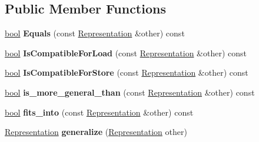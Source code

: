 \subsection*{Public Member Functions}
\begin{DoxyCompactItemize}
\item 
\mbox{\label{classv8_1_1internal_1_1Representation_aa84e9e08d7aa134ade62588b6353aaeb}} 
\mbox{\hyperlink{classbool}{bool}} {\bfseries Equals} (const \mbox{\hyperlink{classv8_1_1internal_1_1Representation}{Representation}} \&other) const
\item 
\mbox{\label{classv8_1_1internal_1_1Representation_a8127928bb5b6b4ab191cf394c6650260}} 
\mbox{\hyperlink{classbool}{bool}} {\bfseries Is\+Compatible\+For\+Load} (const \mbox{\hyperlink{classv8_1_1internal_1_1Representation}{Representation}} \&other) const
\item 
\mbox{\label{classv8_1_1internal_1_1Representation_a5763bb09b83c85d7a1c31c5dc65b25f6}} 
\mbox{\hyperlink{classbool}{bool}} {\bfseries Is\+Compatible\+For\+Store} (const \mbox{\hyperlink{classv8_1_1internal_1_1Representation}{Representation}} \&other) const
\item 
\mbox{\label{classv8_1_1internal_1_1Representation_a204311b6c7ea002cd2a78909b16f4db4}} 
\mbox{\hyperlink{classbool}{bool}} {\bfseries is\+\_\+more\+\_\+general\+\_\+than} (const \mbox{\hyperlink{classv8_1_1internal_1_1Representation}{Representation}} \&other) const
\item 
\mbox{\label{classv8_1_1internal_1_1Representation_a358b22922554e7c1c08eb68e74c8d904}} 
\mbox{\hyperlink{classbool}{bool}} {\bfseries fits\+\_\+into} (const \mbox{\hyperlink{classv8_1_1internal_1_1Representation}{Representation}} \&other) const
\item 
\mbox{\label{classv8_1_1internal_1_1Representation_a8bdd97567badb1040967d90910c76c54}} 
\mbox{\hyperlink{classv8_1_1internal_1_1Representation}{Representation}} {\bfseries generalize} (\mbox{\hyperlink{classv8_1_1internal_1_1Representation}{Representation}} other)
\item 

\end{DoxyCompactItemize}
